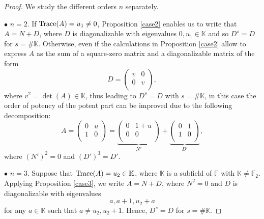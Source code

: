 \documentclass{amsart}
\def\FF{\mathbb{F}}
\def\KK{\mathbb{K}}
\theoremstyle{definition}
\theoremstyle{remark}
\numberwithin{equation}{section}
\begin{document}
\begin{proof} We study the different orders $n$ separately.

\medskip

$\bullet$ $n=2$. If ${\rm Trace}(A)=u_1\ne 0$, Proposition \ref{case2} enables us to write that $A=N+D$, where $D$ is diagonalizable with eigenvalues $0, u_1\in \KK$ and so $D^s=D$ for $s=\# \KK$. Otherwise, even if the calculations in Proposition \ref{case2} allow to express $A$ as the sum of a square-zero matrix and a diagonalizable matrix of the form $$D=\left(
                                                                                                                                      \begin{array}{cc}
                                                                                                                                        v & 0 \\
                                                                                                                                        0 & v \\
                                                                                                                                      \end{array}
                                                                                                                                    \right)
,$$ where $v^2=\det(A)\in \KK$, thus leading to $D^s=D$ with $s =\#\KK$, in this case the order of potency of the potent part can be improved due to the following decomposition:
$$A=
\left(
  \begin{array}{cc}
    0 & u \\
    1 & 0 \\
  \end{array}
\right)=\underbrace{\left(
          \begin{array}{cc}
            0 & 1+u \\
            0 & 0 \\
          \end{array}
        \right)}_{N'}+\underbrace{\left(
          \begin{array}{cc}
            0 & 1 \\
            1 & 0 \\
          \end{array}
        \right)}_{D'},
$$
where $(N')^2=0$ and $(D')^3=D'$.

\medskip

$\bullet$ $n=3$. Suppose that ${\rm Trace}(A)=u_2\in \KK$, where $\KK$ is a subfield of $\FF$ with $\KK\ne \FF_2$. Applying Proposition \ref{case3}, we write $A=N+D$, where $N^2=0$ and $D$ is diagonalizable with eigenvalues $$a, a+1, u_2+a$$ for any $a\in\KK$ such that $a\ne u_2, u_2+1$. Hence, $D^s=D$ for $s=\#\KK$.


\end{proof}
\end{document}
